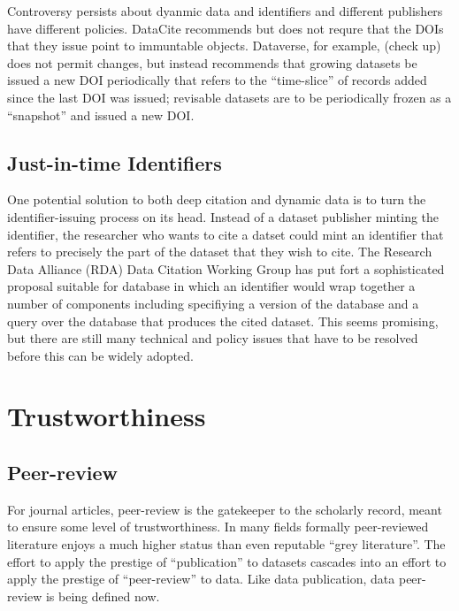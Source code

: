\documentclass[10pt,a4paper,twocolumn]{article}
\begin{document}
Controversy persists about dyanmic data and identifiers and different publishers have different policies. 
DataCite recommends but does not requre that the DOIs that they issue point to immuntable objects. 
Dataverse, for example, (check up) does not permit changes, but instead recommends that growing datasets be issued a new DOI periodically that refers to the ``time-slice'' of records added since the last DOI was issued; revisable datasets are to be periodically frozen as a ``snapshot'' and issued a new DOI.

\subsection*{Just-in-time Identifiers}\label{just-in-time-identifiers}

One potential solution to both deep citation and dynamic data is to turn the identifier-issuing process on its head. 
Instead of a dataset publisher minting the identifier, the researcher who wants to cite a datset could mint an identifier that refers to precisely the part of the dataset that they wish to cite. 
The Research Data Alliance (RDA) Data Citation Working Group has put fort a sophisticated proposal suitable for database in which an identifier would wrap together a number of components including specifiying a version of the database and a query over the database that produces the cited dataset. 
This seems promising, but there are still many technical and policy issues that have to be resolved before this can be widely adopted.

\section*{Trustworthiness}\label{trustworthiness}

\subsection*{Peer-review}\label{peer-review}

For journal articles, peer-review is the gatekeeper to the scholarly record, meant to ensure some level of trustworthiness.
In many fields formally peer-reviewed literature enjoys a much higher status than even reputable ``grey literature''.
The effort to apply the prestige of ``publication'' to datasets cascades into an effort to apply the prestige of ``peer-review'' to data.
Like data publication, data peer-review is being defined now.

\end{document}
